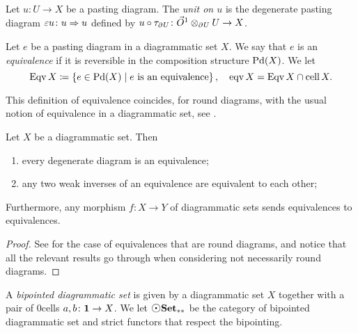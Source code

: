 \begin{dfn} [Unit]
    Let \( u \colon U \to X \) be a pasting diagram.
    The \emph{unit on \( u \)} is the degenerate pasting diagram \( \varepsilon u \colon u \Rightarrow u \) defined by \( u \circ \tau_{\partial_{}^{} U} \colon \vec{O}^{1} \otimes_{\partial_{}^{}U} U \to X \).
\end{dfn}

\begin{dfn} [Equivalence] 
    Let \( e \) be a pasting diagram in a diagrammatic set \( X \).
    We say that \( e \) is an \emph{equivalence} if it is reversible in the composition structure \( \operatorname{Pd}(X) \).
    We let
    \begin{equation*}
        \operatorname{Eqv} X \coloneqq \left\{ {e \in \operatorname{Pd}(X) \mid e \text{ is an equivalence}} \right\},\quad \operatorname{eqv} X = \operatorname{Eqv} X \cap \operatorname{cell} X.
    \end{equation*}
\end{dfn}

\begin{rmk}
    This definition of equivalence coincides, for round diagrams, with the usual notion of equivalence in a diagrammatic set, see \cite[Section 2]{chanavat2024equivalences}.
\end{rmk}

\begin{prop} \label{prop:main_equivalence}
    Let \( X \) be a diagrammatic set.
    Then
    \begin{enumerate}
        \item every degenerate diagram is an equivalence;
        \item any two weak inverses of an equivalence are equivalent to each other;
    \end{enumerate}
    Furthermore, any morphism \( f \colon X \to Y \) of diagrammatic sets sends equivalences to equivalences.
\end{prop}
\begin{proof}
    See \cite[Section]{chanavat2024equivalences} for the case of equivalences that are round diagrams, and notice that all the relevant results go through when considering not necessarily round diagrams.
\end{proof}

\begin{dfn} 
    A \emph{bipointed diagrammatic set} is given by a diagrammatic set \( X \) together with a pair of \( 0 \)\nbd cells \( a, b \colon \mathbf{1} \to X \).
    We let \( \bpt\dgmSet \) be the category of bipointed diagrammatic set and strict functors that respect the bipointing.
\end{dfn}


